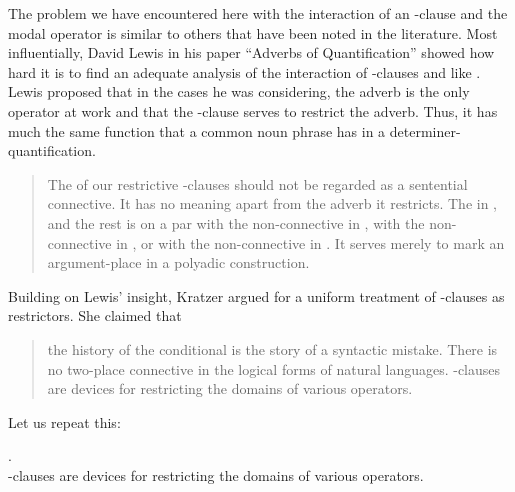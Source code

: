 The problem we have encountered here with the interaction of an -clause and the modal operator  is similar to others that have been noted in the literature. Most influentially, David Lewis in his paper ``Adverbs of Quantification'' showed how hard it is to find an adequate analysis of the interaction of -clauses and  like . Lewis proposed that in the cases he was considering, the adverb is the only operator at work and that the -clause serves to restrict the adverb. Thus, it has much the same function that a common noun phrase has in a determiner-quantification. %

\begin{quote}
	
	The  of our restrictive -clauses should not be regarded as a sentential connective. It has no meaning apart from the adverb it restricts. The  in , and the rest is on a par with the non-connective  in , with the non-connective  in , or with the non-connective  in . It serves merely to mark an argument-place in a polyadic construction. \cite[11]{lewis:1975:adverbs}

\end{quote}
%
Building on Lewis' insight, Kratzer argued for a uniform treatment of -clauses as restrictors. She claimed that 

\begin{quote}
	
	the history of the conditional is the story of a syntactic mistake. There is no two-place  connective in the logical forms of natural languages. -clauses are devices for restricting the domains of various operators. \citep{kratzer:1986:conditionals}
\end{quote}
%
Let us repeat this:

\ex. \\[3pt]
-clauses are devices for restricting the domains of various operators.

